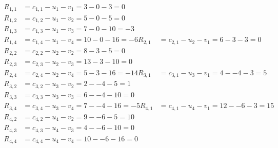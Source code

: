 \[
\begin{aligned}
R_{1,1} &= c_{1,1} - u_{1} - v_{1} = 3 - 0 - 3 = 0 \\
R_{1,2} &= c_{1,2} - u_{1} - v_{2} = 5 - 0 - 5 = 0 \\
R_{1,3} &= c_{1,3} - u_{1} - v_{3} = 7 - 0 - 10 = -3 \\
R_{1,4} &= c_{1,4} - u_{1} - v_{4} = 10 - 0 - 16 = -6 
R_{2,1} &= c_{2,1} - u_{2} - v_{1} = 6 - 3 - 3 = 0 \\
R_{2,2} &= c_{2,2} - u_{2} - v_{2} = 8 - 3 - 5 = 0 \\
R_{2,3} &= c_{2,3} - u_{2} - v_{3} = 13 - 3 - 10 = 0 \\
R_{2,4} &= c_{2,4} - u_{2} - v_{4} = 5 - 3 - 16 = -14 
R_{3,1} &= c_{3,1} - u_{3} - v_{1} = 4 - -4 - 3 = 5 \\
R_{3,2} &= c_{3,2} - u_{3} - v_{2} = 2 - -4 - 5 = 1 \\
R_{3,3} &= c_{3,3} - u_{3} - v_{3} = 6 - -4 - 10 = 0 \\
R_{3,4} &= c_{3,4} - u_{3} - v_{4} = 7 - -4 - 16 = -5 
R_{4,1} &= c_{4,1} - u_{4} - v_{1} = 12 - -6 - 3 = 15 \\
R_{4,2} &= c_{4,2} - u_{4} - v_{2} = 9 - -6 - 5 = 10 \\
R_{4,3} &= c_{4,3} - u_{4} - v_{3} = 4 - -6 - 10 = 0 \\
R_{4,4} &= c_{4,4} - u_{4} - v_{4} = 10 - -6 - 16 = 0 
\end{aligned}
\]

